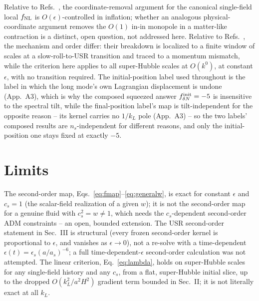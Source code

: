 \documentclass[aps,prd,twocolumn,superscriptaddress,showpacs,preprintnumbers,nofootinbib,longbibliography,floatfix]{revtex4-2}
\newcommand{\fnl}{f_{\rm NL}}
\newcommand{\eps}{\epsilon}
\begin{document}
Relative to Refs.~\cite{Bravo2018a,Bravo2018b}, the coordinate-removal argument for the
canonical single-field local $\fnl$ is $O(\eps)$-controlled in inflation; whether an
analogous physical-coordinate argument removes the $O(1)$ in-in monopole in a matter-like
contraction is a distinct, open question, not addressed here. Relative to
Refs.~\cite{Artigas2022,Jackson2023}, the mechanism and order differ: their breakdown is
localized to a finite window of scales at a slow-roll-to-USR transition and traced to a
momentum mismatch, while the criterion here applies to all super-Hubble scales at $O(k^0)$,
at constant $\eps$, with no transition required. The initial-position label used throughout
is the label in which the long mode's own Lagrangian displacement is undone (App.~A3), which
is why the composed squeezed answer $f_{\delta N}^{\rm init}=-5$ is insensitive to the
spectral tilt, while the final-position label's map is tilt-independent for the opposite
reason -- its kernel carries no $1/k_L$ pole (App.~A3) -- so the two labels' composed
results are $n_s$-independent for different reasons, and only the initial-position one stays
fixed at exactly $-5$.

\section{Limits}

The second-order map, Eqs.~\eqref{eq:fmap}--\eqref{eq:generalw}, is exact for constant
$\eps$ and $c_s=1$ (the scalar-field realization of a given $w$); it is not the
second-order map for a genuine fluid with $c_s^2=w\neq1$, which needs the $c_s$-dependent
second-order ADM constraints -- an open, bounded extension. The USR second-order statement
in Sec.~III is structural (every frozen second-order kernel is proportional to $\eps$, and
vanishes as $\eps\to0$), not a re-solve with a time-dependent $\eps(t)=\eps_s(a/a_s)^{-6}$;
a full time-dependent-$\eps$ second-order calculation was not attempted. The linear
criterion, Eq.~\eqref{eq:lambda}, holds on super-Hubble scales for any single-field history
and any $c_s$, from a flat, super-Hubble initial slice, up to the dropped
$O(k_L^2/a^2H^2)$ gradient term bounded in Sec.~II; it is not literally exact at all $k_L$.
\end{document}
